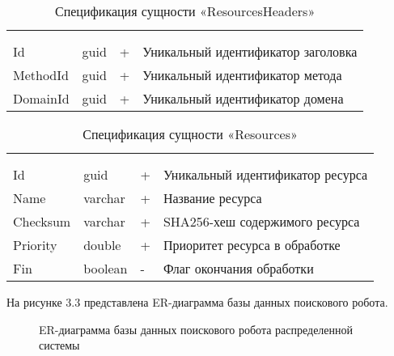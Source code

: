 \begin{xltabular}{\textwidth}{|X|X|X|X|}
	\caption{Спецификация сущности «ResourcesHeaders»}\label{crawler_resources_headers:table}\\ \hline
	 &  &  &  \\ \hline
	 &  &  &  \\ \hline
	\endfirsthead
	 \hline
	 &  &  &  \\ \hline
	\endhead
	Id & guid & + & Уникальный идентификатор заголовка \\ \hline
	MethodId & guid & + & Уникальный идентификатор метода \\ \hline
	DomainId & guid & + & Уникальный идентификатор домена \\ \hline
\end{xltabular}

\begin{xltabular}{\textwidth}{|X|X|X|X|}
	\caption{Спецификация сущности «Resources»}\label{crawler_resources:table}\\ \hline
	 &  &  &  \\ \hline
	 &  &  &  \\ \hline
	\endfirsthead
	 \hline
	 &  &  &  \\ \hline
	\endhead
	Id & guid & + & Уникальный идентификатор ресурса \\ \hline
	Name & varchar & + & Название ресурса \\ \hline
	Checksum & varchar & + & SHA256-хеш содержимого ресурса \\ \hline
	Priority & double & + & Приоритет ресурса в обработке \\ \hline
	Fin & boolean & - & Флаг окончания обработки \\ \hline
\end{xltabular}

На рисунке 3.3 представлена ER-диаграмма базы данных поискового робота.

\begin{figure}[H]
\caption{ER-диаграмма базы данных поискового робота распределенной системы}
\label{robot/robot_db:image}
\end{figure}

